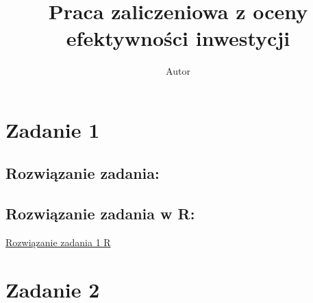 \documentclass{article}
\title{Praca zaliczeniowa z oceny efektywności inwestycji}
\author{Autor}
\date{}
\begin{document}
	\maketitle
	\newpage
	\tableofcontents
	\newpage
	
	\section*{Zadanie 1}
	

	\subsection*{Rozwiązanie zadania:}
	
	
	\subsection*{Rozwiązanie zadania w R:}
	\href{run:./Zadanie1.r}{Rozwiązanie zadania 1 R}
	
	
	
	\newpage
	\section*{Zadanie 2}
\end{document}
